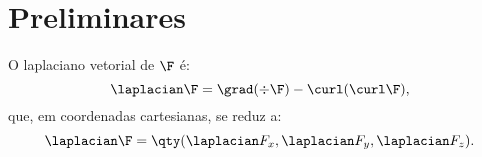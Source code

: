 \section*{Preliminares}

\begin{namedtheorem}
  O laplaciano vetorial de \(\F\) é:
  \[\laplacian\F = \grad(\div\F) - \curl(\curl\F),\]
  que, em coordenadas cartesianas, se reduz a:
  \[\laplacian\F = \qty(\laplacian F_x, \laplacian F_y, \laplacian F_z).\]
\end{namedtheorem}
